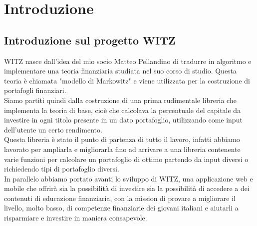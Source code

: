 \chapter{Introduzione}



\section{Introduzione sul progetto WITZ}
WITZ nasce dall’idea del mio socio Matteo Pellandino di tradurre in algoritmo e implementare una teoria finanziaria studiata nel suo corso di studio. Questa teoria è chiamata "modello di Markowitz" e viene utilizzata per la costruzione di portafogli finanziari.\\
Siamo partiti quindi dalla costruzione di una prima rudimentale libreria che implementa la teoria di base, cioè che calcolava la percentuale del capitale da investire in ogni titolo presente in un dato portafoglio, utilizzando come input dell'utente un certo rendimento.\\
Questa libreria è stato il punto di partenza di tutto il lavoro, infatti abbiamo lavorato per ampliarla e migliorarla fino ad arrivare a una libreria contenente varie funzioni per calcolare un portafoglio di ottimo partendo da input diversi o richiedendo tipi di portafoglio diversi.\\
In parallelo abbiamo portato avanti lo sviluppo di WITZ, una applicazione web e mobile che offrirà sia la possibilità di investire sia la possibilità di accedere a dei contenuti di educazione finanziaria, con la mission di provare a migliorare il livello, molto basso, di competenze finanziarie dei giovani italiani e aiutarli a risparmiare e investire in maniera consapevole. 


